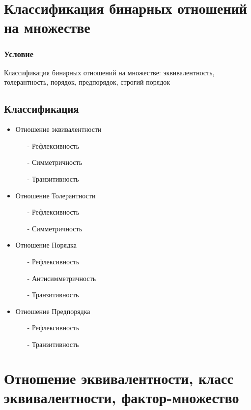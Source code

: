 \documentclass{report}
\begin{document}
\section{Классификация бинарных отношений на множестве}
\subsubsection{Условие}
Классификация бинарных отношений на множестве: эквивалентность, толерантность,
порядок, предпорядок, строгий порядок
\subsection{Классификация}
\begin{itemize}
    \item Отношение эквивалентности
          \begin{itemize}
              \item[-] Рефлексивность
              \item[-] Симметричность
              \item[-] Транзитивность
          \end{itemize}
    \item Отношение Толерантности
          \begin{itemize}
              \item[-] Рефлексивность
              \item[-] Симметричность
          \end{itemize}
    \item Отношение Порядка
          \begin{itemize}
              \item[-] Рефлексивность
              \item[-] Антисимметричность
              \item[-] Транзитивность
          \end{itemize}
    \item Отношение Предпорядка
          \begin{itemize}
              \item[-] Рефлексивность
              \item[-] Транзитивность
          \end{itemize}
\end{itemize}

\newpage

\section{Отношение эквивалентности, класс эквивалентности, фактор-множество}
\end{document}
